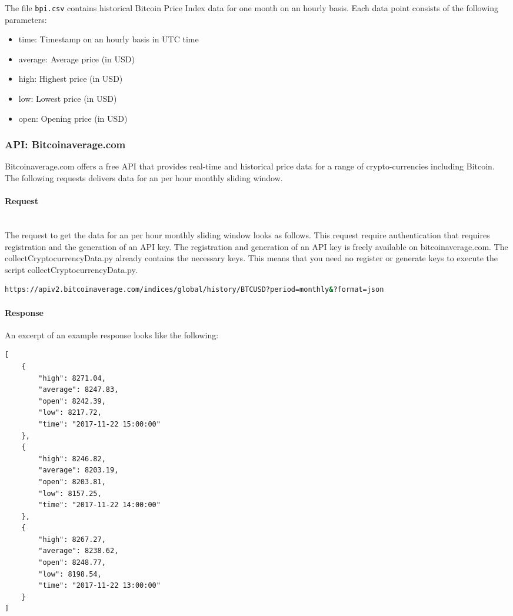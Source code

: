 \documentclass[a4paper,12pt]{article}
\begin{document}
\begin{spacing}{1.2}
The file \verb|bpi.csv| contains historical Bitcoin Price Index data for one month on an hourly basis. Each data point consists of the following parameters:
\begin{itemize}
    \item time: Timestamp on an hourly basis in UTC time
    \item average: Average price (in USD)
    \item high: Highest price (in USD)
    \item low: Lowest price (in USD)
    \item open: Opening price (in USD)
\end{itemize}

\subsubsection{API: Bitcoinaverage.com}
Bitcoinaverage.com offers a free API that provides real-time and historical price data for a range of crypto-currencies including Bitcoin. The following requests delivers data for an per hour monthly sliding window.

\paragraph{Request}\mbox{}\\
The request to get the data for an per hour monthly sliding window looks as follows. This request require authentication that requires registration and the generation of an API key. The registration and generation of an API key is freely available on bitcoinaverage.com. The collectCryptocurrencyData.py already contains the necessary keys. This means that you need no register or generate keys to execute the script collectCryptocurrencyData.py.  
\begin{lstlisting}[language=bash]
https://apiv2.bitcoinaverage.com/indices/global/history/BTCUSD?period=monthly&?format=json
\end{lstlisting}

\paragraph{Response}
An excerpt of an example response looks like the following:
\begin{lstlisting}
[
    {
        "high": 8271.04, 
        "average": 8247.83, 
        "open": 8242.39,
        "low": 8217.72, 
        "time": "2017-11-22 15:00:00"
    }, 
    {
        "high": 8246.82,
        "average": 8203.19,
        "open": 8203.81,
        "low": 8157.25,
        "time": "2017-11-22 14:00:00"
    }, 
    {
        "high": 8267.27, 
        "average": 8238.62, 
        "open": 8248.77, 
        "low": 8198.54, 
        "time": "2017-11-22 13:00:00"
    }
]
\end{lstlisting}


\end{spacing}
\end{document}

